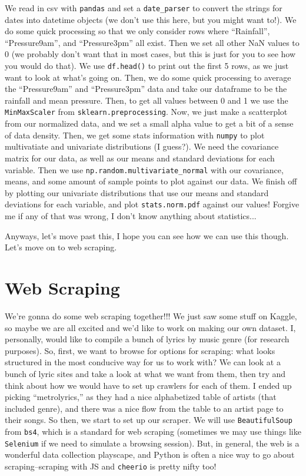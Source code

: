 \documentclass[11pt, twoside, reqno]{book}
\begin{document}
We read in csv with \texttt{pandas} and set a \texttt{date\_parser} to convert the strings for dates into datetime objects (we don't use this here, but you might want to!). We do some quick processing so that we only consider rows where ``Rainfall'', ``Pressure9am'', and ``Pressure3pm'' all exist. Then we set all other NaN values to 0 (we probably don't want that in most cases, but this is just for you to see how you would do that). We use \texttt{df.head()} to print out the first 5 rows, as we just want to look at what's going on. Then, we do some quick processing to average the ``Pressure9am'' and ``Pressure3pm'' data and take our dataframe to be the rainfall and mean pressure. Then, to get all values between 0 and 1 we use the \texttt{MinMaxScaler} from \texttt{sklearn.preprocessing}. Now, we just make a scatterplot from our normalized data, and we set a small alpha value to get a bit of a sense of data density. Then, we get some stats information with \texttt{numpy} to plot multivatiate and univariate distributions (I guess?). We need the covariance matrix for our data, as well as our means and standard deviations for each variable. Then we use \texttt{np.random.multivariate\_normal} with our covariance, means, and some amount of sample points to plot against our data. We finish off by plotting our univariate distributions that use our means and standard deviations for each variable, and plot \texttt{stats.norm.pdf} against our values! Forgive me if any of that was wrong, I don't know anything about statistics...

Anyways, let's move past this, I hope you can see how we can use this though. Let's move on to web scraping.

\section{Web Scraping}

We're gonna do some web scraping together!!! We just saw some stuff on Kaggle, so maybe we are all excited and we'd like to work on making our own dataset. I, personally, would like to compile a bunch of lyrics by music genre (for research purposes). So, first, we want to browse for options for scraping: what looks structured in the most conducive way for us to work with? We can look at a bunch of lyric sites and take a look at what we want from them, then try and think about how we would have to set up crawlers for each of them. I ended up picking ``metrolyrics,'' as they had a nice alphabetized table of artists (that included genre), and there was a nice flow from the table to an artist page to their songs. So then, we start to set up our scraper. We will use \texttt{BeautifulSoup} from \texttt{bs4}, which is a standard for web scraping (sometimes we may use things like \texttt{Selenium} if we need to simulate a browsing session). But, in general, the web is a wonderful data collection playscape, and Python is often a nice way to go about scraping--scraping with JS and \texttt{cheerio} is pretty nifty too!
\end{document}
